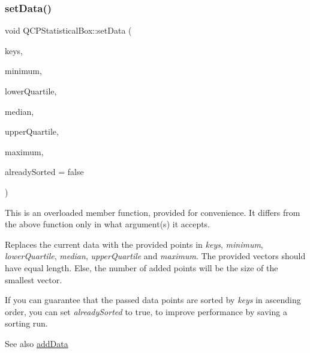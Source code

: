 \subsubsection{\texorpdfstring{set\+Data()}{setData()}\hspace{0.1cm}{\footnotesize\ttfamily [2/2]}}
{\footnotesize\ttfamily void Q\+C\+P\+Statistical\+Box\+::set\+Data (\begin{DoxyParamCaption}\item[{const \hyperlink{class_q_vector}{Q\+Vector}$<$ double $>$ \&}]{keys,  }\item[{const \hyperlink{class_q_vector}{Q\+Vector}$<$ double $>$ \&}]{minimum,  }\item[{const \hyperlink{class_q_vector}{Q\+Vector}$<$ double $>$ \&}]{lower\+Quartile,  }\item[{const \hyperlink{class_q_vector}{Q\+Vector}$<$ double $>$ \&}]{median,  }\item[{const \hyperlink{class_q_vector}{Q\+Vector}$<$ double $>$ \&}]{upper\+Quartile,  }\item[{const \hyperlink{class_q_vector}{Q\+Vector}$<$ double $>$ \&}]{maximum,  }\item[{bool}]{already\+Sorted = {\ttfamily false} }\end{DoxyParamCaption})}

This is an overloaded member function, provided for convenience. It differs from the above function only in what argument(s) it accepts.

Replaces the current data with the provided points in {\itshape keys}, {\itshape minimum}, {\itshape lower\+Quartile}, {\itshape median}, {\itshape upper\+Quartile} and {\itshape maximum}. The provided vectors should have equal length. Else, the number of added points will be the size of the smallest vector.

If you can guarantee that the passed data points are sorted by {\itshape keys} in ascending order, you can set {\itshape already\+Sorted} to true, to improve performance by saving a sorting run.

\begin{DoxySeeAlso}{See also}
\hyperlink{class_q_c_p_statistical_box_a9a8739c5b8291db8fd839e892fc8f478}{add\+Data} 
\end{DoxySeeAlso}
\mbox{\label{class_q_c_p_statistical_box_a7260ac55b669f5d0a74f16d5ca84c52c}} 
